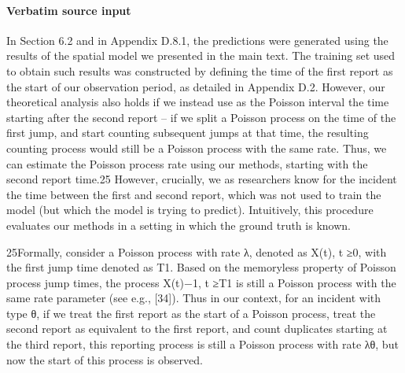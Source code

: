 \documentclass[10pt]{article}
\begin{document}
\paragraph{Verbatim source input}
\begin{ReviewVerbatim}
In Section 6.2 and in Appendix D.8.1, the predictions were generated using the results of the
spatial model we presented in the main text. The training set used to obtain such results was
constructed by defining the time of the first report as the start of our observation period, as
detailed in Appendix D.2.
However, our theoretical analysis also holds if we instead use as the Poisson interval the time
starting after the second report – if we split a Poisson process on the time of the first jump, and start
counting subsequent jumps at that time, the resulting counting process would still be a Poisson
process with the same rate. Thus, we can estimate the Poisson process rate using our methods,
starting with the second report time.25 However, crucially, we as researchers know for the incident
the time between the first and second report, which was not used to train the model (but which the
model is trying to predict). Intuitively, this procedure evaluates our methods in a setting in which
the ground truth is known.

25Formally, consider a Poisson process with rate λ, denoted as {X(t), t ≥0}, with the first jump time denoted as
T1. Based on the memoryless property of Poisson process jump times, the process {X(t)−1, t ≥T1} is still a Poisson
process with the same rate parameter (see e.g., [34]). Thus in our context, for an incident with type θ, if we treat
the first report as the start of a Poisson process, treat the second report as equivalent to the first report, and count
duplicates starting at the third report, this reporting process is still a Poisson process with rate λθ, but now the start
of this process is observed.
\end{ReviewVerbatim}
\end{document}
